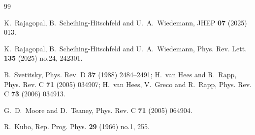 \documentclass[final,3p,times]{elsarticle}
\begin{document}
%
%




\begin{thebibliography}{99}

K.~Rajagopal, B.~Scheihing-Hitschfeld and U.~A.~Wiedemann,
JHEP \textbf{07} (2025) 013.

K.~Rajagopal, B.~Scheihing-Hitschfeld and U.~A.~Wiedemann,
Phys. Rev. Lett. \textbf{135} (2025) no.24, 242301.

B.~Svetitsky,
Phys. Rev. D \textbf{37} (1988) 2484--2491;
H.~van Hees and R.~Rapp,
Phys. Rev. C \textbf{71} (2005) 034907;
H.~van Hees, V.~Greco and R.~Rapp,
Phys. Rev. C \textbf{73} (2006) 034913.

G.~D.~Moore and D.~Teaney,
Phys. Rev. C \textbf{71} (2005) 064904.

R.~Kubo,
Rep. Prog. Phys. \textbf{29} (1966) no.1, 255.


\end{thebibliography}
\end{document}
